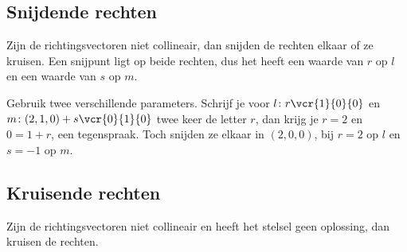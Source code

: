 \begin{oefeningen}
\end{oefeningen}

\subsection{Snijdende rechten}

Zijn de richtingsvectoren niet collineair, dan snijden de rechten elkaar of ze kruisen. Een snijpunt ligt op beide rechten, dus het heeft een waarde van $r$ op $l$ en een waarde van $s$ op $m$.


Gebruik twee verschillende parameters. Schrijf je voor $l\colon r\vcr{1}{0}{0}$ en $m\colon (2, 1, 0) + s\vcr{0}{1}{0}$ twee keer de letter $r$, dan krijg je $r = 2$ en $0 = 1 + r$, een tegenspraak. Toch snijden ze elkaar in $(2, 0, 0)$, bij $r = 2$ op $l$ en $s = -1$ op $m$.

\begin{oefeningen}
\end{oefeningen}

\subsection{Kruisende rechten}

Zijn de richtingsvectoren niet collineair en heeft het stelsel geen oplossing, dan kruisen de rechten.

